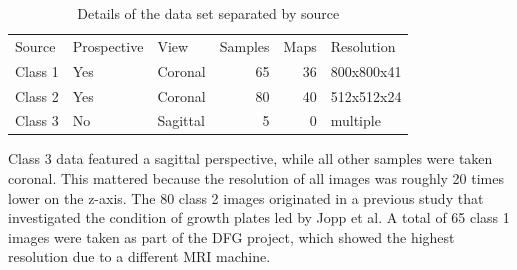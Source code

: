 \begin{table}[h!]
\centering
\begin{tabular}{ | l | l | l | r | r | l |}
  \hline
  Source & Prospective & View & Samples & Maps & Resolution \\
  \Xhline{3\arrayrulewidth}
  Class 1 & Yes        & Coronal     & 65      & 36            & 800x800x41 \\
  \hline
  Class 2 & Yes        & Coronal     & 80      & 40            & 512x512x24 \\
  \hline
  Class 3 & No         & Sagittal    & 5       & 0             & multiple \\
  \hline
\end{tabular}
\caption{Details of the data set separated by source}
\end{table}

Class 3 data featured a sagittal perspective, while all other samples were taken coronal. This mattered because the resolution of all images was roughly 20 times lower on the z-axis. The 80 class 2 images originated in a previous study that investigated the condition of growth plates led by Jopp et al. A total of 65 class 1 images were taken as part of the DFG project, which showed the highest resolution due to a different MRI machine.

